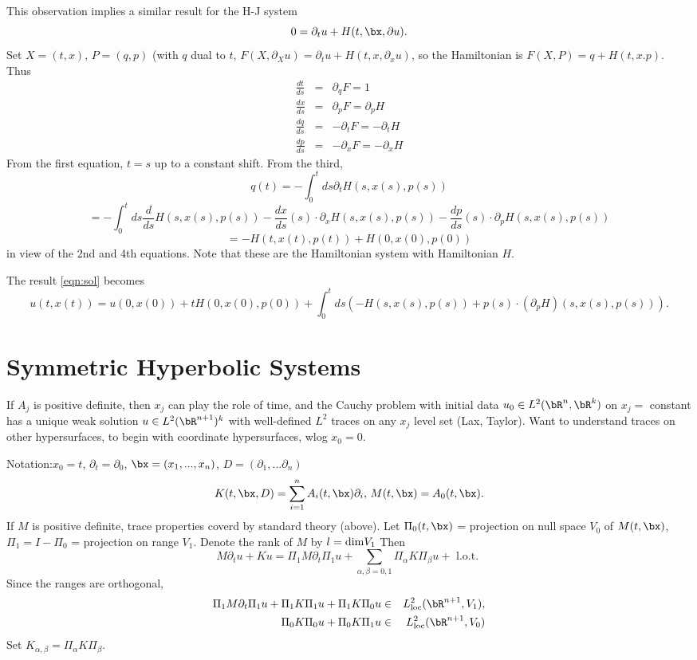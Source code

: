 This observation implies a similar result for the H-J system
\begin{equation}
  \label{eqn:hjdef}
  0 = \partial_t u + H(t,\bx,\partial u).
\end{equation}
Set $X=(t,x)$, $P=(q,p)$ (with $q$ dual to $t$, $F(X,\partial_X u) =
\partial_t u + H(t,x,\partial_x u)$, so the Hamiltonian is $F(X,P) =
q+H(t,x.p)$.  Thus
\begin{eqnarray*}
  \frac{dt}{ds} & = & \partial_q F = 1 \\
  \frac{dx}{ds} & = & \partial_p F = \partial_p H \\
  \frac{dq}{ds} & = & -\partial_t F = -\partial_t H \\
  \frac{dp}{ds} & = & -\partial_x F = -\partial_x H
\end{eqnarray*}
From the first equation, $t=s$ up to a constant shift. From the third,
\[
  q(t) = -\int_0^t ds \partial_tH(s,x(s),p(s))
\]
\[
  = -\int_0^t ds \frac{d}{ds}H(s,x(s),p(s)) - \frac{dx}{ds}(s)\cdot
  \partial_x H(s,x(s),p(s)) -\frac{dp}{ds}(s)\cdot \partial_p
  H(s,x(s),p(s))
\]
\[
  = -H(t,x(t),p(t)) + H(0,x(0),p(0))
\]
in view of the 2nd and 4th equations.
Note that these are the Hamiltonian system with Hamiltonian $H$.

The result \ref{eqn:sol} becomes
\begin{equation}
  \label{eqn:hsol}
  u(t,x(t))=u(0,x(0)) +tH(0,x(0),p(0))+ \int_0^t ds (-H(s,x(s),p(s)) + p(s)\cdot (\partial_p H)(s,x(s),p(s))).
\end{equation}

\section{Symmetric Hyperbolic Systems}

If $A_j$ is positive definite, then $x_j$ can play the role of time, and the Cauchy problem with initial data $u_0 \in L^2(\bR^n,\bR^k)$  on $x_j=$ constant has a unique weak solution $u \in L^2(\bR^{n+1})^k$ with well-defined $L^2$ traces on any $x_j$ level set (Lax, Taylor). Want to understand traces on other hypersurfaces, to begin with coordinate hypersurfaces, wlog $x_0=0$.

Notation:$x_0=t$, $\partial_t=\partial_0$, $\bx = (x_1,...,x_n)$, $D=(\partial_1,...\partial_n)$
\[
  K(t,\bx,D)= \sum_{i=1}^n A_i(t,\bx)\partial_i, \, M(t,\bx) = A_0(t,\bx).
\]
If $M$ is positive definite, trace properties coverd by standard theory (above). Let $\Pi_0(t,\bx)$ = projection on null space $V_0$ of $M(t,\bx)$, $\Pi_1=I-\Pi_0$ = projection on range $V_1$. Denote the rank of $M$ by $l={\rm dim} V_1$ Then
\[
  M\partial_t u + Ku = \Pi_1 M \partial_t \Pi_1 u + \sum_{\alpha,\beta=0,1} \Pi_{\alpha}K\Pi_{\beta}u + \mbox{ l.o.t. }
\]
Since the ranges are orthogonal,
\begin{eqnarray}
  \Pi_1 M \partial_t \Pi_1 u + \Pi_1 K \Pi_1 u + \Pi_1 K \Pi_0 u & \in & L^2_{\rm loc}(\bR^{n+1},V_1),
  \label{eqn:decomp1} \\
  \Pi_0 K \Pi_0 u + \Pi_0 K \Pi_1 u & \in & L^2_{\rm loc}(\bR^{n+1},V_0)
  \label{eqn:decomp0}
\end{eqnarray}
Set $K_{\alpha,\beta} = \Pi_{\alpha}K\Pi_{\beta}$.

